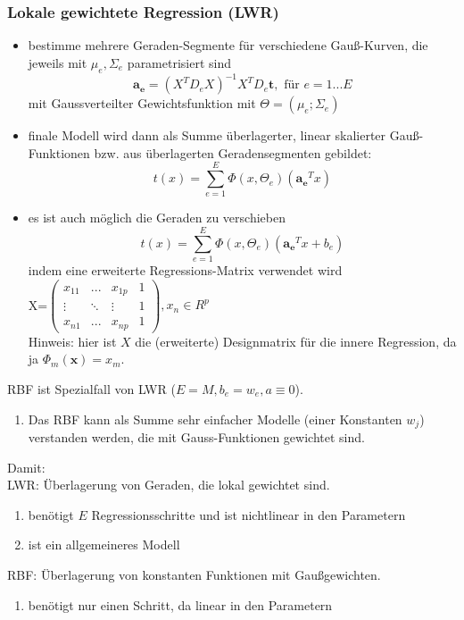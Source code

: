 	\subsubsection{Lokale gewichtete Regression (LWR)}
	\begin{itemize}
		\item bestimme mehrere Geraden-Segmente für verschiedene Gauß-Kurven, die jeweils mit $\mu_e, \Sigma_e$ parametrisiert sind
		\begin{equation*}
			\pmb{a_e} = (X^TD_eX)^{-1}X^TD_e\pmb{t}, \text{ für } e=1...E
		\end{equation*}
		mit Gaussverteilter Gewichtsfunktion mit $\Theta = (\mu_e;\Sigma_e)$
		\item finale Modell wird dann als Summe überlagerter, linear skalierter Gauß-Funktionen bzw. aus überlagerten Geradensegmenten gebildet:
		\begin{equation*}
			t(x) = \sum_{e=1}^E\Phi(x, \Theta_e)(\pmb{a_e}^Tx)
		\end{equation*}
		\item es ist auch möglich die Geraden zu verschieben
		\begin{equation*}
			t(x) = \sum_{e=1}^E\Phi(x, \Theta_e)(\pmb{a_e}^Tx+ b_e)
		\end{equation*}
	indem eine erweiterte Regressions-Matrix verwendet wird\\ X=$\begin{pmatrix}
	x_{11} & ... & x_{1p} & 1\\
	\vdots & \ddots & \vdots & 1\\
	x_{n1} & ... & x_{np} & 1
	\end{pmatrix}, x_n \in R^p$\\[5pt]
	Hinweis: hier ist $X$ die (erweiterte) Designmatrix für die \dq innere Regression\dq, da ja $\Phi_m(\pmb{x})=x_m$.
	\end{itemize}
	RBF ist Spezialfall von LWR ($E=M, b_e=w_e, a \equiv 0$).\vspace*{-5pt}
	\begin{enumerate}[$\hookrightarrow$]
		\item Das RBF kann als Summe sehr einfacher Modelle (einer Konstanten $w_j$) verstanden werden, die mit Gauss-Funktionen gewichtet sind.
	\end{enumerate}
	Damit:\\[5pt]
	LWR: Überlagerung von Geraden, die lokal gewichtet sind.\vspace*{-5pt}
	\begin{enumerate}[$\hookrightarrow$]
		\item benötigt $E$ Regressionsschritte und ist nichtlinear in den Parametern
		\item ist ein allgemeineres Modell
	\end{enumerate}
	RBF: Überlagerung von konstanten Funktionen mit Gaußgewichten.\vspace*{-5pt}
	\begin{enumerate}[$\hookrightarrow$]
		\item benötigt nur einen Schritt, da linear in den Parametern
	\end{enumerate}
